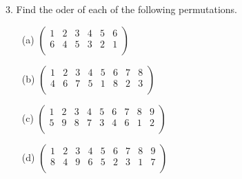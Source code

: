 \begin{mdframed}[style=darkAnswer,frametitle={Joe Starr}]
\end{mdframed}
\newpage
\begin{mdframed}[style=darkQuesion]
  3. Find the oder of each of the following permutations. 
  \begin{itemize}
    \item [(a)] {
      $\begin{pmatrix}
        1 & 2 & 3 & 4 & 5 & 6\\
        6 & 4 & 5 & 3 & 2 & 1\\
      \end{pmatrix}$
    }
    \item [(b)] {
      $\begin{pmatrix}
        1 & 2 & 3 & 4 & 5 & 6 & 7 & 8\\
        4 & 6 & 7 & 5 & 1 & 8 & 2 & 3\\
      \end{pmatrix}$
    }
    \item [(c)] {
      $\begin{pmatrix}
        1 & 2 & 3 & 4 & 5 & 6 & 7 & 8 & 9\\
        5 & 9 & 8 & 7 & 3 & 4 & 6 & 1 & 2\\
      \end{pmatrix}$
    }
    \item [(d)] {
      $\begin{pmatrix}
        1 & 2 & 3 & 4 & 5 & 6 & 7 & 8 & 9 \\
        8 & 4 & 9 & 6 & 5 & 2 & 3 & 1 & 7\\
      \end{pmatrix}$
    }
  \end{itemize} 
\end{mdframed}
  
